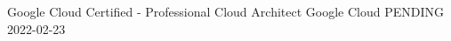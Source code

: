 \awarditem
    {Google Cloud Certified - Professional Cloud Architect}
    {Google Cloud}
    {PENDING}
    {2022-02-23}
